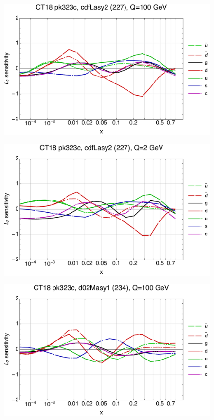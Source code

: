 \documentclass[10pt,aps,prd,floatfix,titlepage]{revtex4}
\begin{document}
\clearpage
\begin{figure}
\includegraphics[width=\textwidth,height=0.44\textheight,keepaspectratio]{1/227_ct18nn_L2_q100_Sf_1.pdf}
\caption{}
\end{figure}
\begin{figure}
\includegraphics[width=\textwidth,height=0.44\textheight,keepaspectratio]{1/227_ct18nn_L2_q2_Sf_1.pdf}
\caption{}
\end{figure}
\clearpage
\begin{figure}
\includegraphics[width=\textwidth,height=0.44\textheight,keepaspectratio]{1/234_ct18nn_L2_q100_Sf_1.pdf}
\caption{}
\end{figure}
\end{document}
